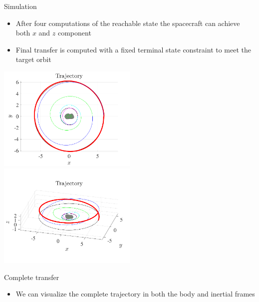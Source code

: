 \documentclass[11pt,professionalfonts]{beamer}
\begin{document}
\begin{frame}{Simulation}
    \begin{itemize}
        \item After four computations of the reachable state the spacecraft can achieve both \( x\) and \( z\) component
        \item Final transfer is computed with a fixed terminal state constraint to meet the target orbit
    \end{itemize}

    \begin{center}
        \includegraphics[width=0.5\textwidth]{figures/trajectory.pdf}
        \hfill
        \includegraphics[width=0.5\textwidth]{figures/trajectory_3d.pdf}
    \end{center}

\end{frame}

\begin{frame}{Complete transfer}
\begin{itemize}
    \item We can visualize the complete trajectory in both the body and inertial frames
\end{itemize}

\begin{center}
  ~\hfill
\end{center}

\end{frame}
\end{document}
